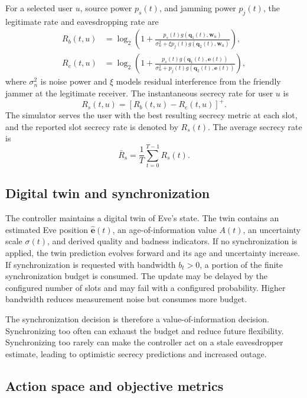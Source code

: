 For a selected user $u$, source power $p_s(t)$, and jamming power $p_j(t)$, the legitimate rate and eavesdropping rate are
\begin{align}
    R_b(t,u) &=
    \log_2\left(1+
    \frac{p_s(t)g(\mathbf{q}_1(t),\mathbf{w}_u)}
    {\sigma_n^2+\xi p_j(t)g(\mathbf{q}_2(t),\mathbf{w}_u)}
    \right), \\
    R_e(t,u) &=
    \log_2\left(1+
    \frac{p_s(t)g(\mathbf{q}_1(t),\mathbf{e}(t))}
    {\sigma_n^2+p_j(t)g(\mathbf{q}_2(t),\mathbf{e}(t))}
    \right),
\end{align}
where $\sigma_n^2$ is noise power and $\xi$ models residual interference from the friendly jammer at the legitimate receiver. The instantaneous secrecy rate for user $u$ is
\begin{equation}
    R_s(t,u)=\left[R_b(t,u)-R_e(t,u)\right]^+.
\end{equation}
The simulator serves the user with the best resulting secrecy metric at each slot, and the reported slot secrecy rate is denoted by $R_s(t)$. The average secrecy rate is
\begin{equation}
    \bar{R}_s=\frac{1}{T}\sum_{t=0}^{T-1}R_s(t).
\end{equation}

\subsection{Digital twin and synchronization}

The controller maintains a digital twin of Eve's state. The twin contains an estimated Eve position $\hat{\mathbf{e}}(t)$, an age-of-information value $A(t)$, an uncertainty scale $\sigma(t)$, and derived quality and badness indicators. If no synchronization is applied, the twin prediction evolves forward and its age and uncertainty increase. If synchronization is requested with bandwidth $b_t>0$, a portion of the finite synchronization budget is consumed. The update may be delayed by the configured number of slots and may fail with a configured probability. Higher bandwidth reduces measurement noise but consumes more budget.

The synchronization decision is therefore a value-of-information decision. Synchronizing too often can exhaust the budget and reduce future flexibility. Synchronizing too rarely can make the controller act on a stale eavesdropper estimate, leading to optimistic secrecy predictions and increased outage.

\subsection{Action space and objective metrics}

